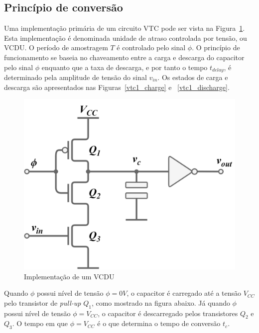\documentclass[
	12pt,				%
	openright,			%
	twoside,			%
	a4paper,			%
	english,			%
	french,				%
	spanish,			%
	brazil,				%
	]{abntex2}
\begin{document}
		\subsection{Princípio de conversão}

			Uma implementação primária de um circuito VTC pode ser vista na Figura~\ref{fig:vtc1}. Esta implementação é denominada unidade de atraso controlada por tensão, ou VCDU\cite{Fei}. O período de amostragem $T$ é controlado pelo sinal $\phi$. O princípio de funcionamento se baseia no chaveamento entre a carga e descarga do capacitor pelo sinal $\phi$ enquanto que a taxa de descarga, e por tanto o tempo $t_{delay}$, é determinado pela amplitude de tensão do sinal $v_{in}$. Os estados de carga e descarga são apresentados nas Figuras~\ref{vtc1_charge} e ~\ref{vtc1_discharge}.

			\begin{figure}[h]
				\centering
				\includegraphics[width=\linewidth/2]{images/VTC_circ1.png}
				\caption{Implementação de um VCDU}
				\label{fig:vtc1}
			\end{figure}

			Quando $\phi$ possui nível de tensão $\phi=0 V$, o capacitor é carregado até a tensão $V_{CC}$ pelo transistor de \textit{pull-up} $Q_1$, como mostrado na figura abaixo. Já quando $\phi$ possui nível de tensão $\phi=V_{CC}$, o capacitor é descarregado pelos transistores $Q_2$ e $Q_3$. O tempo em que $\phi=V_{CC}$ é o que determina o tempo de conversão $t_c$.
\end{document}
